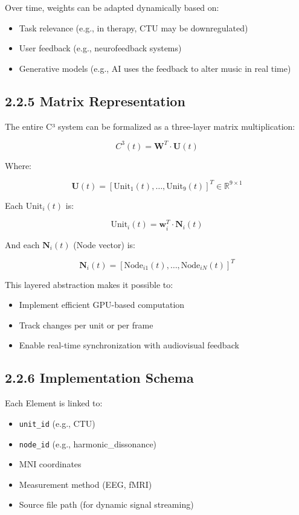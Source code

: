 Over time, weights can be adapted dynamically based on:

\begin{itemize}
    \item Task relevance (e.g., in therapy, CTU may be downregulated)
    \item User feedback (e.g., neurofeedback systems)
    \item Generative models (e.g., AI uses the feedback to alter music in real time)
\end{itemize}

\subsection*{2.2.5 Matrix Representation}

The entire C³ system can be formalized as a three-layer matrix multiplication:

\[
C^3(t) = \mathbf{W}^T \cdot \mathbf{U}(t)
\]

Where:

\[
\mathbf{U}(t) = [\text{Unit}_1(t), \ldots, \text{Unit}_9(t)]^T \in \mathbb{R}^{9 \times 1}
\]

Each $\text{Unit}_i(t)$ is:

\[
\text{Unit}_i(t) = \mathbf{w}_i^T \cdot \mathbf{N}_i(t)
\]

And each $\mathbf{N}_i(t)$ (Node vector) is:

\[
\mathbf{N}_i(t) = [\text{Node}_{i1}(t), \ldots, \text{Node}_{iN}(t)]^T
\]

This layered abstraction makes it possible to:

\begin{itemize}
    \item Implement efficient GPU-based computation
    \item Track changes per unit or per frame
    \item Enable real-time synchronization with audiovisual feedback
\end{itemize}

\subsection*{2.2.6 Implementation Schema}

Each Element is linked to:

\begin{itemize}
    \item \texttt{unit\_id} (e.g., CTU)
    \item \texttt{node\_id} (e.g., harmonic\_dissonance)
    \item MNI coordinates
    \item Measurement method (EEG, fMRI)
    \item Source file path (for dynamic signal streaming)
\end{itemize}

